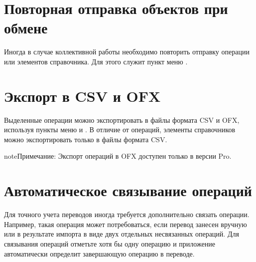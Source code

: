 \documentclass[a4paper,10pt,russian]{sphinxmanual}
\begin{document}
\noindent{}
\noindent{}


\section{Повторная отправка объектов при обмене}
\label{\detokenize{bulk-actions:id6}}
\sphinxAtStartPar
Иногда в случае коллективной работы необходимо повторить отправку операции или элементов справочника. Для этого служит
пункт меню .

\noindent{}
\noindent{}
\noindent{}


\section{Экспорт в CSV и OFX}
\label{\detokenize{bulk-actions:csv-ofx}}
\sphinxAtStartPar
Выделенные операции можно экспортировать в файлы формата CSV и OFX, используя пункты меню 
и . В отличие от операций, элементы справочников можно экспортировать только в файлы формата
CSV.

\begin{sphinxadmonition}{note}{Примечание:}
\sphinxAtStartPar
Экспорт операций в OFX доступен только в версии Pro.
\end{sphinxadmonition}

\noindent{}
\noindent{}
\noindent{}


\section{Автоматическое связывание операций}
\label{\detokenize{bulk-actions:id7}}
\sphinxAtStartPar
Для точного учета переводов иногда требуется дополнительно связать операции. Например,
такая операция может потребоваться, если перевод занесен вручную или в результате импорта
в виде двух отдельных несвязанных операций. Для связывания операций отметьте хотя бы
одну операцию и приложение автоматически определит завершающую операцию в переводе.
\end{document}
